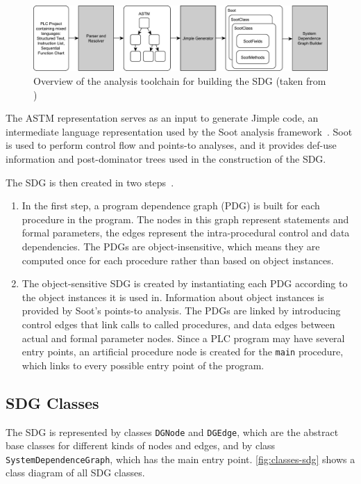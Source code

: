 \begin{figure}[ht]
  \centering
    \includegraphics[width=\textwidth]{bilder/toolchain}
  \caption{Overview of the analysis toolchain for building the SDG (taken from \cite{GrimmerDA})}
  \label{fig:toolchain}
\end{figure}

The ASTM representation serves as an input to generate Jimple code, an intermediate language representation used by the 
Soot analysis framework~\cite{Soot}. Soot is used to perform control flow and points-to analyses, and it provides 
def-use information and post-dominator trees used in the construction of the SDG.

The SDG is then created in two steps~\cite[ch.~6]{GrimmerDA}.

\begin{enumerate}
  \item In the first step, a program dependence graph (PDG) is built for each procedure in the program. The nodes in 
  this graph represent statements and formal parameters, the edges represent the intra-procedural control and data 
  dependencies. The PDGs are object-insensitive, which means they are computed once for each procedure rather than 
  based on object instances.
  
  \item The object-sensitive SDG is created by instantiating each PDG according to the object instances 
  it is used in. Information about object instances is provided by Soot's points-to analysis. The PDGs are linked by 
  introducing control edges that link calls to called procedures, and data edges between actual and formal parameter 
  nodes. Since a PLC program may have several entry points, an artificial procedure node is created for the 
  \lstinline|main| procedure, which links to every possible entry point of the program.
\end{enumerate}

\subsection{SDG Classes} \label{sec:classes}

The SDG is represented by classes \lstinline|DGNode| and \lstinline|DGEdge|, which are the abstract base classes for 
different kinds of nodes and edges, and by class \lstinline|SystemDependenceGraph|, which has the main entry point. 
\autoref{fig:classes-sdg} shows a class diagram of all SDG classes.

